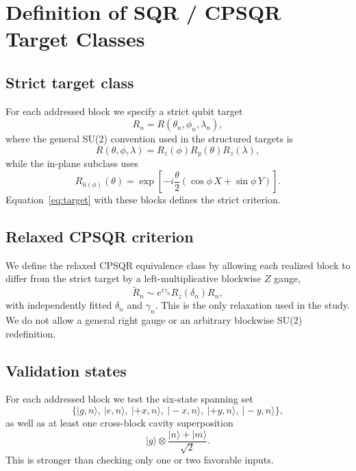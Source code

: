 \documentclass[aps,pra,twocolumn,reprint,floatfix,amsmath,amssymb]{revtex4-2}
\begin{document}
\section{Definition of SQR / CPSQR Target Classes}
\subsection{Strict target class}
For each addressed block we specify a strict qubit target
\begin{equation}
R_n = R(\theta_n,\phi_n,\lambda_n),
\end{equation}
where the general SU(2) convention used in the structured targets is
\begin{equation}
R(\theta,\phi,\lambda)
=
R_z(\phi) R_y(\theta) R_z(\lambda),
\end{equation}
while the in-plane subclass uses
\begin{equation}
R_{\hat{n}(\phi)}(\theta)
=
\exp\!\left[
-i \frac{\theta}{2}
\left(
\cos\phi\, X + \sin\phi\, Y
\right)
\right].
\end{equation}
Equation~\eqref{eq:target} with these blocks defines the strict criterion.

\subsection{Relaxed CPSQR criterion}
We define the relaxed CPSQR equivalence class by allowing each realized block to differ from the strict target by a left-multiplicative blockwise $Z$ gauge,
\begin{equation}
\widetilde{R}_n \sim e^{i\gamma_n} R_z(\delta_n) R_n ,
\label{eq:relaxed}
\end{equation}
with independently fitted $\delta_n$ and $\gamma_n$.  This is the only relaxation used in the study.  We do not allow a general right gauge or an arbitrary blockwise SU(2) redefinition.

\subsection{Validation states}
For each addressed block we test the six-state spanning set
\begin{equation}
\{
|g,n\rangle,\ |e,n\rangle,\ |{+}x,n\rangle,\ |{-}x,n\rangle,\ |{+}y,n\rangle,\ |{-}y,n\rangle
\},
\end{equation}
as well as at least one cross-block cavity superposition
\begin{equation}
|g\rangle \otimes \frac{|n\rangle + |m\rangle}{\sqrt{2}}.
\end{equation}
This is stronger than checking only one or two favorable inputs.
\end{document}
